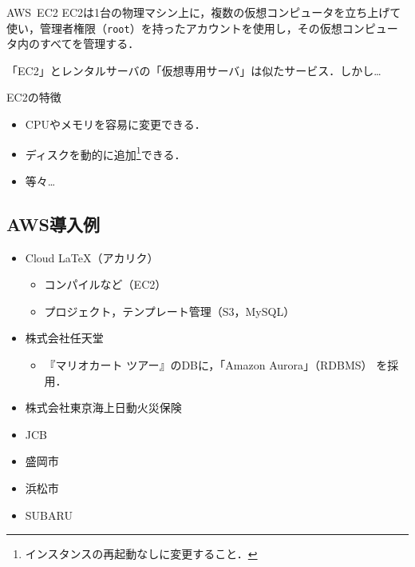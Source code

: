 \begin{frame}[t]{\ftitle}
    \begin{block}{AWS\ EC2}
        EC2は1台の物理マシン上に，複数の仮想コンピュータを立ち上げて使い，管理者権限（\texttt{root}）を持ったアカウントを使用し，その仮想コンピュータ内のすべてを管理する．\hfill\cite{2015amazon}
    \end{block}
    「EC2」とレンタルサーバの「仮想専用サーバ」は似たサービス．しかし\dots
    \begin{exampleblock}{EC2の特徴}
        \begin{itemize}
            \item CPUやメモリを容易に変更できる．\hfill{}
            \item ディスクを動的に追加\footnote{インスタンスの再起動なしに変更すること．}できる．
                  \item[]\hfill 等々\dots
        \end{itemize}
    \end{exampleblock}
\end{frame}
\subsection{AWS導入例}
\begin{frame}[t]{\ftitle}
    \begin{itemize}
        \item Cloud LaTeX（アカリク）
              \begin{itemize}
                  \item コンパイルなど（EC2）
                  \item プロジェクト，テンプレート管理（S3，MySQL）
              \end{itemize}
        \item 株式会社任天堂
              \begin{itemize}
                  \item 『マリオカート ツアー』のDBに，「Amazon Aurora」（RDBMS） を採用．
              \end{itemize}
        \item 株式会社東京海上日動火災保険
        \item JCB
        \item 盛岡市
        \item 浜松市
        \item SUBARU
    \end{itemize}
    \hfill\cite{導入事例}
\end{frame}
